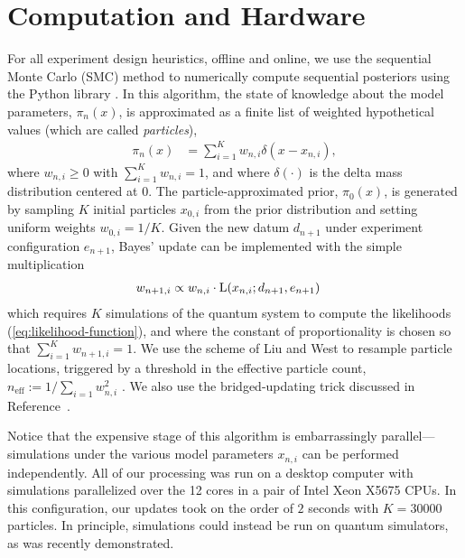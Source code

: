 \documentclass[aps,nofootinbib,twocolumn,superscriptaddress]{revtex4}
\newcommand{\mps}{x}
\newcommand{\eps}{e}
\newcommand{\data}{d}
\begin{document}
\section{Computation and Hardware}
\label{sec:computation-and-hardware}

For all experiment design heuristics, offline and online,
we use the sequential Monte Carlo (SMC) \cite{doucet_tutorial_2009}
method to numerically compute sequential posteriors
using the Python library \qinfer \cite{granade_qinfer:_2017}.
In this algorithm, the state of knowledge about the model
parameters, $\pi_n(\mps)$,
is approximated as a finite list of weighted hypothetical values
(which are called \textit{particles}),
\begin{align}
    \pi_n(\mps)
        &= \sum_{i=1}^{K}w_{n,i} \delta(\mps-\mps_{n,i}),
    \label{eq:particle-approximation}
\end{align}
where $w_{n,i}\geq 0$ with $\sum_{i=1}^K w_{n,i}=1$, and where
$\delta(\cdot)$ is the delta mass distribution centered at $0$.
The particle-approximated prior, $\pi_0(\mps)$, is generated by
sampling $K$ initial particles $\mps_{0,i}$ from the prior distribution
and setting uniform weights $w_{0,i}=1/K$.
Given the new datum $\data_{n+1}$ under experiment
configuration $\eps_{n+1}$,
Bayes' update can be implemented with the simple multiplication
\begin{align}
    w_{n+1,i}
        &\propto w_{n,i}\cdot \Lhood(\mps_{n,i};\data_{n+1},\eps_{n+1})
    \label{eq:particle-update}
\end{align}
which requires $K$ simulations of the quantum system to
compute the likelihoods (\autoref{eq:likelihood-function}), and where
the constant of proportionality is chosen so that
$\sum_{i=1}^K w_{n+1,i}=1$.
We use the scheme of Liu and West \cite{liu_combined_2001}
to resample particle locations,
triggered by a threshold in the effective particle count,
$n_\text{eff}:=1/\sum_{i=1} w_{n,i}^2$ \cite{granade_qinfer:_2017}.
We also use the bridged-updating trick discussed in
Reference~\cite{hincks_statistical_2018}.

Notice that the expensive stage of this algorithm is
embarrassingly parallel---simulations under the various
model parameters $\mps_{n,i}$ can be performed independently.
All of our processing was run on a desktop computer with simulations
parallelized over the 12 cores in a pair of Intel Xeon X5675 CPUs.
In this configuration, our updates took on the order of $2$ seconds
with $K=30000$ particles.
In principle, simulations could instead be run on quantum simulators,
as was recently demonstrated\cite{wang_experimental_2017}.
\end{document}
